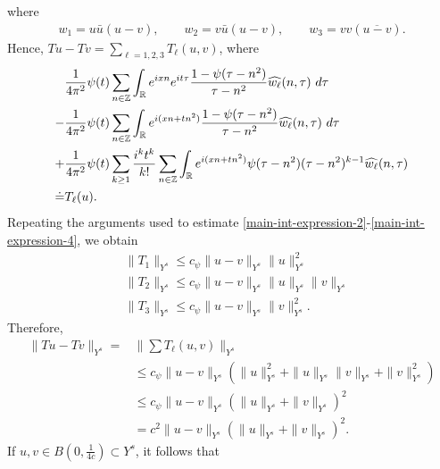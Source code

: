 \documentclass[12pt,reqno]{amsart}
\numberwithin{equation}{section}  %
\numberwithin{figure}{section}
\newcommand{\rr}{\mathbb{R}}
\newcommand{\zz}{\mathbb{Z}}
\newcommand{\wh}{\widehat}
\theoremstyle{plain}
\theoremstyle{definition}
\theoremstyle{remark}
\begin{document}
%
where
%
\begin{equation*}
	\begin{split}
		w_1 = u \bar u \left( u -v \right), \qquad w_2 = v \bar u \left( u -v 
		\right), \qquad w_3 = v v \left( \overline{u -v} \right).
	\end{split}
\end{equation*}
%
Hence, $Tu - Tv = \sum_{\ell=1, 2, 3} 
T_\ell(u, v)$, where
\begin{align}
	\label{main-int-exp-mod1}
	& \frac{1}{4 \pi^2} \psi(t) \sum_{n\in \zz} \int_\rr e^{ixn}  
		e^{it \tau} \frac{ 1 - \psi(\tau - n^2) 
		}{\tau - n^2} \wh{w_\ell}(n, \tau) \ d \tau
		\\
		\label{main-int-exp-mod2}
		- & \frac{1}{4 \pi^2} \psi(t) \sum_{n\in \zz} \int_\rr e^{i(xn + 
		tn^2)}
		 \frac{1- \psi(\tau - n^2)}{\tau - n^2} \wh{w_\ell}(n, \tau) \ d \tau
		\\
		\label{main-int-exp-mod3}
		+ & \frac{1}{4 \pi^2} \psi(t) \sum_{k \ge 1} \frac{i^k t^k}{k!}
		\sum_{n \in \zz} \int_\rr e^{i(xn + tn^2 )}
		\psi(\tau - n^2) (\tau - n^2)^{k-1} \wh{w_\ell}(n, \tau)  
		\\
		\doteq & T_\ell(u). \notag
\end{align}
Repeating the arguments used to estimate 
\eqref{main-int-expression-2}-\eqref{main-int-expression-4}, we obtain
%
\begin{equation*}
	\begin{split}
		& \|T_1\|_{Y^s} \le c_\psi \|u -v \|_{Y^s} \|u\|^2_{Y^s}
		\\
		& \|T_2\|_{Y^s} \le c_\psi \|u -v \|_{Y^s} \|u\|_{Y^s} \|v\|_{Y^s}
		\\
		& \|T_3\|_{Y^s} \le c_\psi \|u -v \|_{Y^s} \|v\|_{Y^s}^2.
	\end{split}
\end{equation*}
%
Therefore,
%
\begin{equation}
	\label{20a}
	\begin{split}
		\|Tu - Tv \|_{Y^s} = & \| \sum T_\ell(u, v) \|_{Y^s}
		\\
		& \le c_\psi \|u -v \|_{Y^s} \left( \|u\|_{Y^s}^2 + 
		\|u\|_{Y^s} \|v\|_{Y^s} + \|v\|_{Y^s}^2 \right)
		\\
		& \le c_\psi \|u -v\|_{Y^s} \left( \|u\|_{Y^s} + \|v\|_{Y^s} \right)^2
		\\
		& = c^2 \|u -v\|_{Y^s} \left( \|u\|_{Y^s} + \|v\|_{Y^s} \right)^2.
	\end{split}
\end{equation}
%
If $u, v \in B(0, \frac{1}{4c}) \subset Y^s$, it follows that
\end{document}

